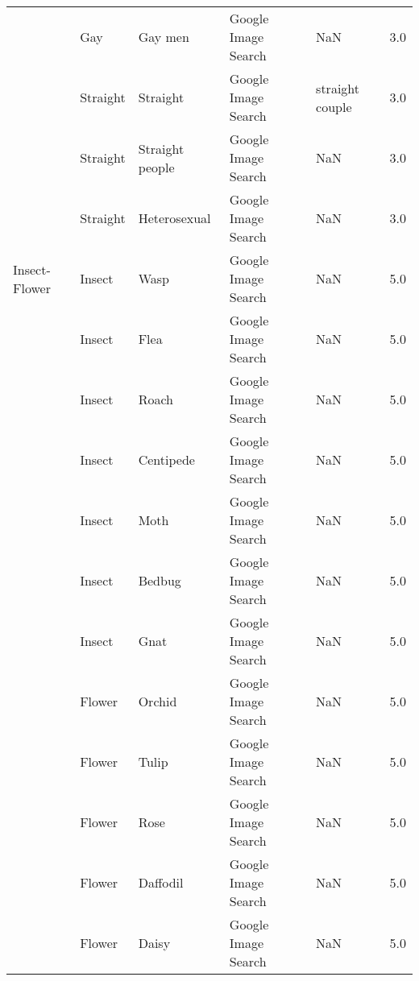 \begin{tabular}{lllllr}
          & Gay &          Gay men &  Google Image Search &                                                NaN &   3.0 \\
          & Straight &         Straight &  Google Image Search &                                    straight couple &   3.0 \\
          & Straight &  Straight people &  Google Image Search &                                                NaN &   3.0 \\
          & Straight &     Heterosexual &  Google Image Search &                                                NaN &   3.0 \\
Insect-Flower & Insect &             Wasp &  Google Image Search &                                                NaN &   5.0 \\
          & Insect &             Flea &  Google Image Search &                                                NaN &   5.0 \\
          & Insect &            Roach &  Google Image Search &                                                NaN &   5.0 \\
          & Insect &        Centipede &  Google Image Search &                                                NaN &   5.0 \\
          & Insect &             Moth &  Google Image Search &                                                NaN &   5.0 \\
          & Insect &           Bedbug &  Google Image Search &                                                NaN &   5.0 \\
          & Insect &             Gnat &  Google Image Search &                                                NaN &   5.0 \\
          & Flower &           Orchid &  Google Image Search &                                                NaN &   5.0 \\
          & Flower &            Tulip &  Google Image Search &                                                NaN &   5.0 \\
          & Flower &             Rose &  Google Image Search &                                                NaN &   5.0 \\
          & Flower &         Daffodil &  Google Image Search &                                                NaN &   5.0 \\
          & Flower &            Daisy &  Google Image Search &                                                NaN &   5.0 \\

\end{tabular}
